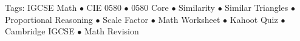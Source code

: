 \documentclass[11pt,a4paper]{article}
\begin{document}
\vspace{14pt}
\begin{center}
  \sffamily\scriptsize\textcolor{textmuted}{
    Tags: IGCSE Math $\bullet$ CIE 0580 $\bullet$ 0580 Core $\bullet$ Similarity $\bullet$ Similar Triangles $\bullet$ Proportional Reasoning $\bullet$ Scale Factor $\bullet$ Math Worksheet $\bullet$ Kahoot Quiz $\bullet$ Cambridge IGCSE $\bullet$ Math Revision
  }
\end{center}
\end{document}
